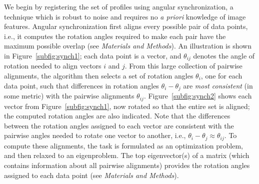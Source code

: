 \documentclass{pnastwo}
\begin{document}
\begin{article}
We begin by registering the set of profiles using angular synchronization\cite{singer2011angular}, a technique which is robust to noise and requires no {\em a priori} knowledge of image features.
%
Angular synchronization first aligns every possible pair of data points, i.e., it computes the rotation angles
required to make each pair have the maximum possible overlap (see {\it Materials and Methods}).
%
An illustration is shown in Figure~\ref{subfig:synch1};
each data point is a vector, and $\theta_{ij}$ denotes the angle of rotation needed to align vectors $i$ and $j$.
%
From this large collection of pairwise alignments, the algorithm then selects a set of rotation angles $\theta_i$, one for each data point, such that differences in rotation angles $\theta_i-\theta_j$ are {\em most consistent} (in some metric) with the pairwise alignments $\theta_{ij}$.
%
Figure~\ref{subfig:synch2} shows each vector from Figure~\ref{subfig:synch1}, now rotated so that the entire set is aligned; the computed rotation angles are also indicated.
%
Note that the differences between the rotation angles assigned to each vector are consistent with the pairwise angles needed to rotate one vector to another, i.e., $\theta_i - \theta_j \approx \theta_{ij}$.
%
To compute these alignments, the task is formulated as an optimization problem, and then relaxed to an eigenproblem.
%
The top eigenvector(s) of a matrix (which contains information about all pairwise alignments)
provides the rotation angles assigned to each data point (see {\it Materials and Methods}).
%


\end{article}
\end{document}
